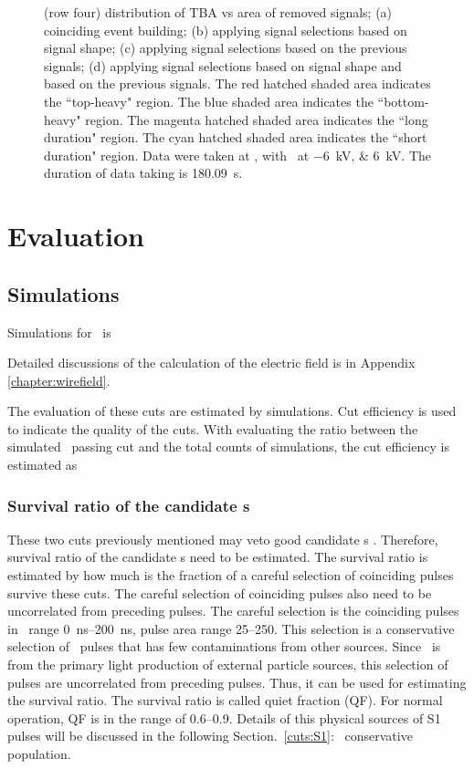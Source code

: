 \begin{landscape}
\begin{figure}[!p]
{			(row four) distribution of TBA vs area of removed signals;
			(a) coinciding event building; 
			(b) applying signal selections based on signal shape;
			(c) applying signal selections based on the previous signals;
			(d) applying signal selections based on signal shape and based on the previous signals.
			The red hatched shaded area indicates the ``top-heavy" region.
			The blue shaded area indicates the ``bottom-heavy" region.
			The magenta hatched shaded area indicates the ``long duration" region.
			The cyan hatched shaded area indicates the ``short duration" region.
			Data were taken at , with \opvtvb\ at \SIlist{-6;+6}{kV}. The duration of data taking is \SI{180.09}{\s}.
		}
		\label{fig:signal selection dv -12}
	\end{figure}
\end{landscape}
\section{Evaluation}
\subsection{Simulations}
Simulations for \ees\ is

Detailed discussions of the calculation of the electric field is in Appendix \ref{chapter:wirefield}.


The evaluation of these cuts are estimated by simulations. Cut efficiency is used to indicate the quality of the cuts. With evaluating the ratio between the simulated \ees\ passing cut and the total counts of simulations, the cut efficiency is estimated as 
\subsubsection{Survival ratio of the candidate \ees s}
These two cuts previously mentioned may veto good candidate \ees s . Therefore, survival ratio of the candidate \ees s need to be estimated. The survival ratio is estimated by how much is the fraction of a careful selection of coinciding pulses survive these cuts.
The careful selection of coinciding pulses also need to be uncorrelated from preceding pulses. The careful selection is the coinciding pulses in \ttwoseven\ range \SIrange{0}{200}{\ns},  pulse area range \SIrange{25}{250}{\phe}. This selection is a conservative selection of \sone\ pulses that has few contaminations from other sources. Since \sone\ is from the primary light production of external particle sources, this selection of pulses are uncorrelated from preceding pulses. Thus, it can be used for estimating the survival ratio. The survival ratio is called quiet fraction (QF). For normal operation, QF is in the range of \numrange{0.6}{0.9}. Details of this physical sources of S1 pulses will be discussed in the following Section.~\ref{cuts:S1}: \sone\ conservative population. 

